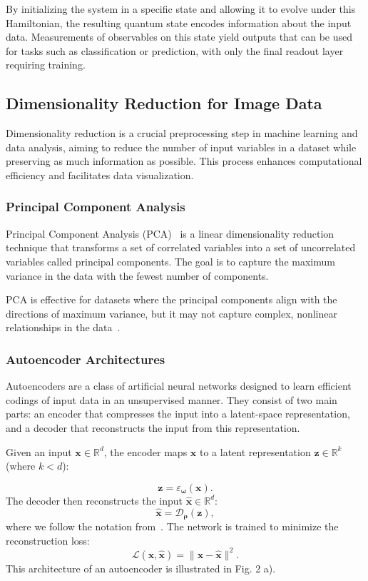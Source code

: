 \documentclass[conference]{IEEEtran}
\begin{document}
By initializing the system in a specific state and allowing 
it to evolve under this Hamiltonian, the resulting quantum 
state encodes information about the input data. Measurements 
of observables on this state yield outputs that can be used 
for tasks such as classification or prediction, with only the 
final readout layer requiring training.


\subsection{Dimensionality Reduction for Image Data}
Dimensionality reduction is a crucial preprocessing step in 
machine learning and data analysis, aiming to reduce the 
number of input variables in a dataset while preserving as 
much information as possible. This process enhances 
computational efficiency and facilitates data visualization.


\subsubsection{Principal Component Analysis}
Principal Component Analysis (PCA)~\cite{shlensTutorialPrincipalComponent2014} is a linear dimensionality 
reduction technique that transforms a set of correlated 
variables into a set of uncorrelated variables called 
principal components. The goal is to capture the maximum 
variance in the data with the fewest number of components.

PCA is effective for datasets where the principal components 
align with the directions of maximum variance, but it may not 
capture complex, nonlinear relationships in the data~\cite{jolliffePrincipalComponentAnalysis2016}.

\subsubsection{Autoencoder Architectures}
Autoencoders are a class of artificial neural networks 
designed to learn efficient codings of input data in an 
unsupervised manner. They consist of two main parts: an 
encoder that compresses the input into a latent-space 
representation, and a decoder that reconstructs the input 
from this representation.

Given an input \( \bm x \in \mathbb{R}^d \), the encoder maps 
\( \bm x \) to a latent representation \( \bm z \in \mathbb{R}^k \) 
(where \( k < d \)):

\begin{equation}
    \bm z = \varepsilon_{\bm\omega}(\bm x).
\end{equation}
%
The decoder then reconstructs the input $\bm{\hat{x}} \in \mathbb{R}^d$:
\begin{equation}
    \bm{\hat{x}} = \mathcal{D}_{\bm \rho} (\bm z),
\end{equation}
where we follow the notation from~\cite{belisGuidedQuantumCompression2024}.
The network is trained to minimize the reconstruction loss:
\begin{equation}
    \mathcal{L}(\bm{x}, \bm{\hat{x}}) = \| \bm{x} - \bm{\hat{x}} \|^2.
\end{equation}
%
This architecture of an autoencoder is illustrated in Fig. 2 a). %
\end{document}
